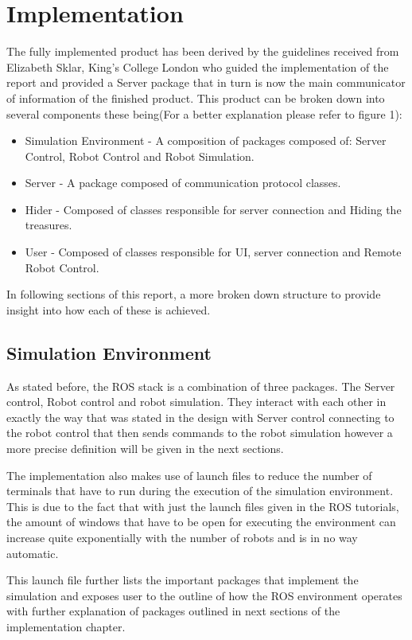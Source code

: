 \documentclass{report}
\begin{document}
  \chapter{Implementation}
    The fully implemented product has been derived by the guidelines received from Elizabeth Sklar, King's College London who guided the implementation of the report and provided a Server package that in turn is now the main communicator of information of the finished product. This product can be broken down into several components these being(For a better explanation please refer to figure 1):
    \begin{itemize}
      \item Simulation Environment - A composition of packages composed of: Server Control, Robot Control and Robot Simulation.
      \item Server - A package composed of communication protocol classes.
      \item Hider - Composed of classes responsible for server connection and Hiding the treasures.
      \item User - Composed of classes responsible for UI, server connection and Remote Robot Control.
    \end{itemize}

    In following sections of this report, a more broken down structure to provide insight into how each of these is achieved.

    \section{Simulation Environment}
      As stated before, the ROS stack is a combination of three packages. The Server control, Robot control and robot simulation. They interact with each other in exactly the way that was stated in the design with Server control connecting to the robot control that then sends commands to the robot simulation however a more precise definition will be given in the next sections.

      The implementation also makes use of launch files to reduce the number of terminals that have to run during the execution of the simulation environment. This is due to the fact that with just the launch files given in the ROS tutorials, the amount of windows that have to be open for executing the environment can increase quite exponentially with the number of robots and is in no way automatic.

      This launch file further lists the important packages that implement the simulation and exposes user to the outline of how the ROS environment operates with further explanation of packages outlined in next sections of the implementation chapter.
\end{document}
